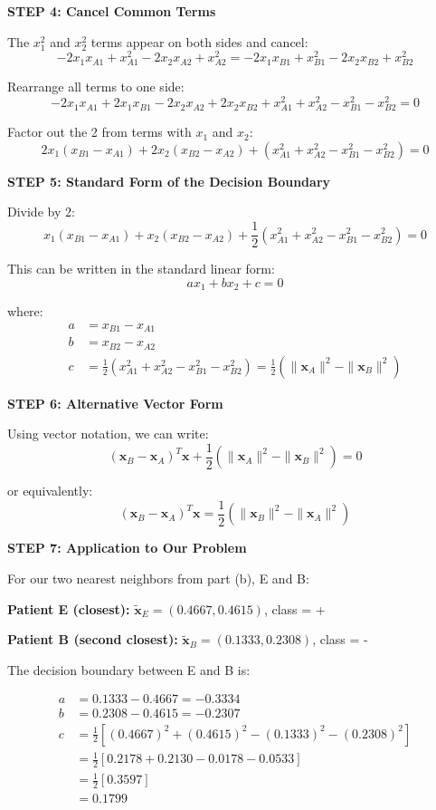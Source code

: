 \documentclass[12pt]{article}
\begin{document}
\begin{solution}
\textbf{STEP 4: Cancel Common Terms}

The \(x_1^2\) and \(x_2^2\) terms appear on both sides and cancel:
\[
- 2x_1 x_{A1} + x_{A1}^2 - 2x_2 x_{A2} + x_{A2}^2 = - 2x_1 x_{B1} + x_{B1}^2 - 2x_2 x_{B2} + x_{B2}^2
\]

Rearrange all terms to one side:
\[
- 2x_1 x_{A1} + 2x_1 x_{B1} - 2x_2 x_{A2} + 2x_2 x_{B2} + x_{A1}^2 + x_{A2}^2 - x_{B1}^2 - x_{B2}^2 = 0
\]

Factor out the 2 from terms with \(x_1\) and \(x_2\):
\[
2x_1(x_{B1} - x_{A1}) + 2x_2(x_{B2} - x_{A2}) + (x_{A1}^2 + x_{A2}^2 - x_{B1}^2 - x_{B2}^2) = 0
\]

\textbf{STEP 5: Standard Form of the Decision Boundary}

Divide by 2:
\[
x_1(x_{B1} - x_{A1}) + x_2(x_{B2} - x_{A2}) + \frac{1}{2}(x_{A1}^2 + x_{A2}^2 - x_{B1}^2 - x_{B2}^2) = 0
\]

This can be written in the standard linear form:
\[
\boxed{ax_1 + bx_2 + c = 0}
\]

where:
\begin{align*}
a &= x_{B1} - x_{A1} \\
b &= x_{B2} - x_{A2} \\
c &= \frac{1}{2}(x_{A1}^2 + x_{A2}^2 - x_{B1}^2 - x_{B2}^2) = \frac{1}{2}(\|\mathbf{x}_A\|^2 - \|\mathbf{x}_B\|^2)
\end{align*}

\textbf{STEP 6: Alternative Vector Form}

Using vector notation, we can write:
\[
(\mathbf{x}_B - \mathbf{x}_A)^T \mathbf{x} + \frac{1}{2}(\|\mathbf{x}_A\|^2 - \|\mathbf{x}_B\|^2) = 0
\]

or equivalently:
\[
(\mathbf{x}_B - \mathbf{x}_A)^T \mathbf{x} = \frac{1}{2}(\|\mathbf{x}_B\|^2 - \|\mathbf{x}_A\|^2)
\]

\textbf{STEP 7: Application to Our Problem}

For our two nearest neighbors from part (b), E and B:

\textbf{Patient E (closest):} \(\tilde{\mathbf{x}}_E = (0.4667, 0.4615)\), class = +

\textbf{Patient B (second closest):} \(\tilde{\mathbf{x}}_B = (0.1333, 0.2308)\), class = -

The decision boundary between E and B is:

\begin{align*}
a &= 0.1333 - 0.4667 = -0.3334 \\
b &= 0.2308 - 0.4615 = -0.2307 \\
c &= \frac{1}{2}[(0.4667)^2 + (0.4615)^2 - (0.1333)^2 - (0.2308)^2] \\
  &= \frac{1}{2}[0.2178 + 0.2130 - 0.0178 - 0.0533] \\
  &= \frac{1}{2}[0.3597] \\
  &= 0.1799
\end{align*}


\end{solution}
\end{document}
